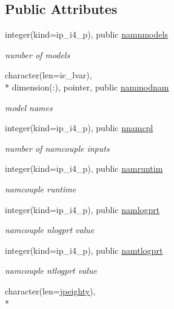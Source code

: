 \subsection*{Public Attributes}
\begin{DoxyCompactItemize}
\item 
integer(kind=ip\+\_\+i4\+\_\+p), public \hyperlink{classmod__oasis__namcouple_ab94a99d4801cf5a16beaa5ca3bb41046}{namnmodels}
\begin{DoxyCompactList}\small\item\em number of models \end{DoxyCompactList}\item 
character(len=ic\+\_\+lvar), \\*
dimension(\+:), pointer, public \hyperlink{classmod__oasis__namcouple_a4b17296f706edcb9695f25babe240f23}{nammodnam}
\begin{DoxyCompactList}\small\item\em model names \end{DoxyCompactList}\item 
integer(kind=ip\+\_\+i4\+\_\+p), public \hyperlink{classmod__oasis__namcouple_a5ca7cd6a5b9f939b68492200aa92bab4}{nnamcpl}
\begin{DoxyCompactList}\small\item\em number of namcouple inputs \end{DoxyCompactList}\item 
integer(kind=ip\+\_\+i4\+\_\+p), public \hyperlink{classmod__oasis__namcouple_a14505eaa91b2c8ba308c63ff78652206}{namruntim}
\begin{DoxyCompactList}\small\item\em namcouple runtime \end{DoxyCompactList}\item 
integer(kind=ip\+\_\+i4\+\_\+p), public \hyperlink{classmod__oasis__namcouple_a46affda5336f60a1eeb1badaaccd3cfd}{namlogprt}
\begin{DoxyCompactList}\small\item\em namcouple nlogprt value \end{DoxyCompactList}\item 
integer(kind=ip\+\_\+i4\+\_\+p), public \hyperlink{classmod__oasis__namcouple_a45fbbd2941f5d71991d409f63e31cf02}{namtlogprt}
\begin{DoxyCompactList}\small\item\em namcouple ntlogprt value \end{DoxyCompactList}\item 
character(len=\hyperlink{classmod__oasis__namcouple_a4fb10ad6e864dcbe34c4a8b02204a523}{jpeighty}), \\*

\end{DoxyCompactItemize}
